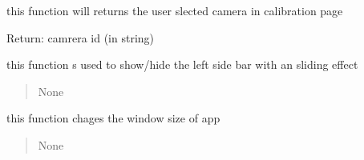 \documentclass[letterpaper,10pt,english]{sphinxmanual}
\begin{document}
\begin{savenotes}
\begin{fulllineitems}
\begin{savenotes}
\begin{fulllineitems}
\begin{quote}
\begin{description}
\end{description}\end{quote}

\end{fulllineitems}\end{savenotes}


\begin{savenotes}\begin{fulllineitems}
\label{\detokenize{setting/setting_UI:oxin.setting_UI.UI_main_window.get_width_guage_parms}}
\pysigstartsignatures
{}
\pysigstopsignatures
\sphinxAtStartPar
this function will returns the user slected camera in calibration page

\sphinxAtStartPar
Return: camrera id (in string)

\end{fulllineitems}\end{savenotes}


\begin{savenotes}\begin{fulllineitems}
\label{\detokenize{setting/setting_UI:oxin.setting_UI.UI_main_window.leftmenu}}
\pysigstartsignatures
{}
\pysigstopsignatures
\sphinxAtStartPar
this function s used to show/hide the left side bar with an sliding effect
\begin{quote}\begin{description}
\sphinxAtStartPar
None

\end{description}\end{quote}

\end{fulllineitems}\end{savenotes}


\begin{savenotes}\begin{fulllineitems}
\label{\detokenize{setting/setting_UI:oxin.setting_UI.UI_main_window.maxmize_minimize}}
\pysigstartsignatures
{}
\pysigstopsignatures
\sphinxAtStartPar
this function chages the window size of app
\begin{quote}\begin{description}
\sphinxAtStartPar
None


\end{description}
\end{quote}
\end{fulllineitems}
\end{savenotes}
\end{fulllineitems}
\end{savenotes}
\end{document}
